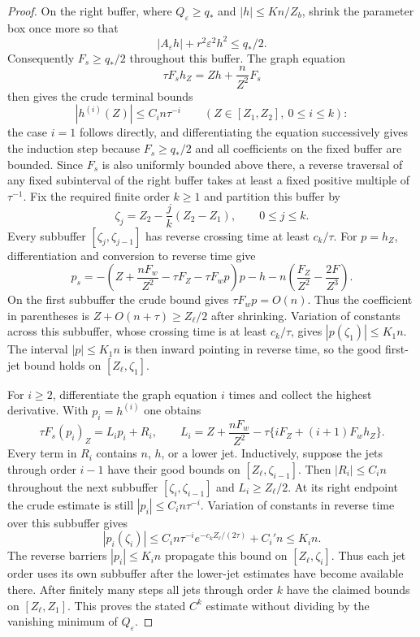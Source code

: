 \begin{proof}
On the right buffer, where $Q_\varepsilon\ge q_*$ and $|h|\le K n/Z_b$,
shrink the parameter box once more so that
\[
 |A_\varepsilon h|+r^2\varepsilon^2h^2\le q_*/2.
\]
Consequently $F_s\ge q_*/2$ throughout this buffer.  The graph equation
\[
 \tau F_s h_Z=Zh+\frac{n}{Z^2}F_s
\]
then gives the crude terminal bounds
\[
 |h^{(i)}(Z)|\le C_i n\tau^{-i}
       \qquad(Z\in[Z_1,Z_2],\ 0\le i\le k):
\]
the case $i=1$ follows directly, and differentiating the equation
successively gives the induction step because $F_s\ge q_*/2$ and all
coefficients on the fixed buffer are bounded.  Since $F_s$ is also
uniformly bounded above there, a reverse traversal of any fixed subinterval
of the right buffer takes at least a fixed positive multiple of
$\tau^{-1}$.  Fix the required finite order $k\ge1$ and partition this
buffer by
\[
 \zeta_j=Z_2-\frac{j}{k}(Z_2-Z_1),\qquad 0\le j\le k.
\]
Every subbuffer $[\zeta_j,\zeta_{j-1}]$ has reverse crossing time at
least $c_k/\tau$.  For $p=h_Z$, differentiation and
conversion to reverse time give
\[
 p_s=-\left(Z+\frac{nF_w}{Z^2}-\tau F_Z-\tau F_wp\right)p
      -h-n\left(\frac{F_Z}{Z^2}-\frac{2F}{Z^3}\right).
\]
On the first subbuffer the crude bound gives $\tau F_wp=O(n)$.
Thus the coefficient in parentheses is $Z+O(n+\tau)\ge Z_\ell/2$
after shrinking. Variation of constants across this subbuffer, whose
crossing time is at least $c_k/\tau$, gives $|p(\zeta_1)|\le K_1n$.
The interval $|p|\le K_1n$ is then inward pointing in reverse time,
so the good first-jet bound holds on $[Z_\ell,\zeta_1]$.

For $i\ge2$, differentiate the graph equation $i$ times and collect the
highest derivative.  With $p_i=h^{(i)}$ one obtains
\[
 \tau F_s(p_i)_Z=L_i p_i+R_i,\qquad
 L_i=Z+\frac{nF_w}{Z^2}
       -\tau\{iF_Z+(i+1)F_wh_Z\}.
\]
Every term in $R_i$ contains $n$, $h$, or a lower jet.
Inductively, suppose the jets through order $i-1$ have their good bounds
on $[Z_\ell,\zeta_{i-1}]$. Then $|R_i|\le C_i n$ throughout the next
subbuffer $[\zeta_i,\zeta_{i-1}]$ and $L_i\ge Z_\ell/2$.
At its right endpoint the crude estimate is still
$|p_i|\le C_i n\tau^{-i}$.  Variation of constants in reverse time
over this subbuffer gives
\[
 |p_i(\zeta_i)|\le C_i n\tau^{-i}
       e^{-c_kZ_\ell/(2\tau)}+C_i'n\le K_i n.
\]
The reverse barriers $|p_i|\le K_i n$ propagate this bound on
$[Z_\ell,\zeta_i]$. Thus each jet order uses its own subbuffer after
the lower-jet estimates have become available there.  After finitely
many steps all jets through order $k$ have the claimed bounds on
$[Z_\ell,Z_1]$.
This proves the stated $C^k$ estimate without dividing by the vanishing
minimum of $Q_\varepsilon$.
\end{proof}

